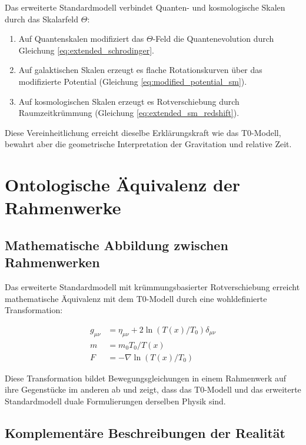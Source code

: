 \documentclass[twocolumn,aps,prl]{revtex4-2}
\begin{document}
	Das erweiterte Standardmodell verbindet Quanten- und kosmologische Skalen durch das Skalarfeld \(\Theta\):
	
	\begin{enumerate}
		\item Auf Quantenskalen modifiziert das \(\Theta\)-Feld die Quantenevolution durch Gleichung \ref{eq:extended_schrodinger}.
		\item Auf galaktischen Skalen erzeugt es flache Rotationskurven über das modifizierte Potential (Gleichung \ref{eq:modified_potential_sm}).
		\item Auf kosmologischen Skalen erzeugt es Rotverschiebung durch Raumzeitkrümmung (Gleichung \ref{eq:extended_sm_redshift}).
	\end{enumerate}
	
	Diese Vereinheitlichung erreicht dieselbe Erklärungskraft wie das T0-Modell, bewahrt aber die geometrische Interpretation der Gravitation und relative Zeit.
	
	\section{Ontologische Äquivalenz der Rahmenwerke}
	\label{sec:ontological_equivalence}
	
	\subsection{Mathematische Abbildung zwischen Rahmenwerken}
	\label{subsec:mathematical_mapping}
	
	Das erweiterte Standardmodell mit krümmungsbasierter Rotverschiebung erreicht mathematische Äquivalenz mit dem T0-Modell durch eine wohldefinierte Transformation:
	
	\begin{equation}
		\begin{aligned}
			g_{\mu\nu} &= \eta_{\mu\nu} + 2\ln(T(x)/T_0)\delta_{\mu\nu} \\
			m &= m_0T_0/T(x) \\
			F &= -\nabla\ln(T(x)/T_0)
		\end{aligned}
		\label{eq:framework_transformation}
	\end{equation}
	
	Diese Transformation bildet Bewegungsgleichungen in einem Rahmenwerk auf ihre Gegenstücke im anderen ab und zeigt, dass das T0-Modell und das erweiterte Standardmodell duale Formulierungen derselben Physik sind.
	
	\subsection{Komplementäre Beschreibungen der Realität}
	\label{subsec:complementary_descriptions}
	
\end{document}
